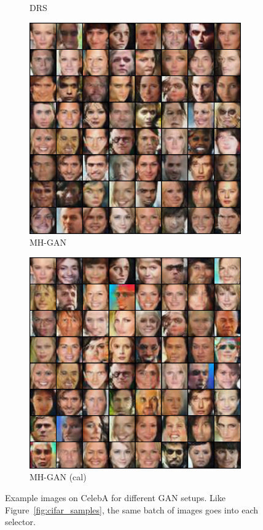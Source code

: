 \begin{figure}[htbp]
\begin{subfigure}[b]{0.49\textwidth}
       \caption{DRS}
    \end{subfigure}
    \begin{subfigure}[b]{0.49\textwidth}
       \centering
       \includegraphics[width=\exfactor\textwidth]{figures/celeba/31_base_raw_MH.png}
       \caption{MH-GAN}
    \end{subfigure}
    \begin{subfigure}[b]{0.49\textwidth}
       \centering
       \includegraphics[width=\exfactor\textwidth]{figures/celeba/31_base_iso_MH.png}
       \caption{MH-GAN (cal)}
    \end{subfigure}
    \caption{{\small
    Example images on CelebA for different GAN setups.
    Like Figure~\ref{fig:cifar_samples}, the same batch of images goes into each selector.
    }}
    \label{fig:celeba_samples}
\end{figure}
